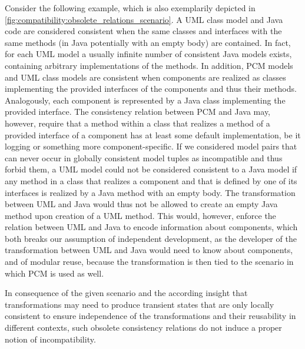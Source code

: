 Consider the following example, which is also exemplarily depicted in \autoref{fig:compatibility:obsolete_relations_scenario}.
A UML class model and Java code are considered consistent when the same classes and interfaces with the same methods (in Java potentially with an empty body) are contained.
In fact, for each UML model a usually infinite number of consistent Java models exists, containing arbitrary implementations of the methods.
In addition, \gls{PCM} models and UML class models are consistent when components are realized as classes implementing the provided interfaces of the components and thus their methods.
Analogously, each component is represented by a Java class implementing the provided interface.
The consistency relation between \gls{PCM} and Java may, however, require that a method within a class that realizes a method of a provided interface of a component has at least some default implementation, be it logging or something more component-specific.
If we considered model pairs that can never occur in globally consistent model tuples as incompatible and thus forbid them, a UML model could not be considered consistent to a Java model if any method in a class that realizes a component and that is defined by one of its interfaces is realized by a Java method with an empty body.
The transformation between UML and Java would thus not be allowed to create an empty Java method upon creation of a UML method.
This would, however, enforce the relation between UML and Java to encode information about components, which both breaks our assumption of independent development, as the developer of the transformation between UML and Java would need to know about components, and of modular reuse, because the transformation is then tied to the scenario in which \gls{PCM} is used as well.

In consequence of the given scenario and the according insight that transformations may need to produce transient states that are only locally consistent to ensure independence of the transformations and their reusability in different contexts, such obsolete consistency relations do not induce a proper notion of incompatibility.

